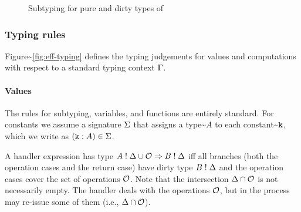 \documentclass[sigplan,10pt]{acmart}\settopmatter{printfolios=true}
\begin{document}
\begin{figure}[h]
\begin{center}
\end{center}
\caption{Subtyping for pure and dirty types of \eff}\label{fig:subtyping}
\end{figure}

\subsubsection{Typing rules}\label{typing-rules}

Figure\textasciitilde{}\ref{fig:eff-typing} defines the typing
judgements for values and computations with respect to a standard typing
context \(\Gamma\).

\paragraph{Values}

The rules for subtyping, variables, and functions are entirely standard.
For constants we assume a signature \(\Sigma\) that assigns a
type\textasciitilde{}\(A\) to each constant\textasciitilde{}\(\mathtt{k}\),
which we write as \((\mathtt{k} \mathrel{:} A) \in \Sigma\).

A handler expression has type \(A \mathrel{!} \Delta \cup \mathcal{O} \Rightarrow B \mathrel{!} \Delta\)
iff all branches (both the operation cases and the return case) have
dirty type \(B \mathrel{!} \Delta\) and the operation cases cover the set of
operations \(\mathcal{O}\). Note that the intersection \(\Delta \cap \mathcal{O}\) is
not necessarily empty. The handler deals with the operations \(\mathcal{O}\),
but in the process may re-issue some of them (i.e.,
\(\Delta \cap \mathcal{O}\)).
\end{document}
